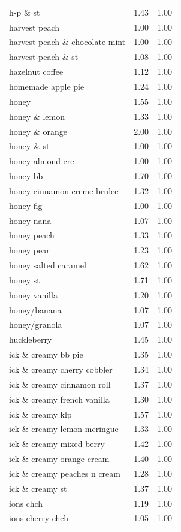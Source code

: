\begin{table}
\begin{tabular}{lrr}
h-p \& st & 1.43 & 1.00 \\
harvest peach & 1.00 & 1.00 \\
harvest peach \& chocolate mint & 1.00 & 1.00 \\
harvest peach \& st & 1.08 & 1.00 \\
hazelnut coffee & 1.12 & 1.00 \\
homemade apple pie & 1.24 & 1.00 \\
honey & 1.55 & 1.00 \\
honey \& lemon & 1.33 & 1.00 \\
honey \& orange & 2.00 & 1.00 \\
honey \& st & 1.00 & 1.00 \\
honey almond cre & 1.00 & 1.00 \\
honey bb & 1.70 & 1.00 \\
honey cinnamon creme brulee & 1.32 & 1.00 \\
honey fig & 1.00 & 1.00 \\
honey nana & 1.07 & 1.00 \\
honey peach & 1.33 & 1.00 \\
honey pear & 1.23 & 1.00 \\
honey salted caramel & 1.62 & 1.00 \\
honey st & 1.71 & 1.00 \\
honey vanilla & 1.20 & 1.00 \\
honey/banana & 1.07 & 1.00 \\
honey/granola & 1.07 & 1.00 \\
huckleberry & 1.45 & 1.00 \\
ick \& creamy bb pie & 1.35 & 1.00 \\
ick \& creamy cherry cobbler & 1.34 & 1.00 \\
ick \& creamy cinnamon roll & 1.37 & 1.00 \\
ick \& creamy french vanilla & 1.30 & 1.00 \\
ick \& creamy klp & 1.57 & 1.00 \\
ick \& creamy lemon meringue & 1.33 & 1.00 \\
ick \& creamy mixed berry & 1.42 & 1.00 \\
ick \& creamy orange cream & 1.40 & 1.00 \\
ick \& creamy peaches n cream & 1.28 & 1.00 \\
ick \& creamy st & 1.37 & 1.00 \\
ions chch & 1.19 & 1.00 \\
ions cherry chch & 1.05 & 1.00 \\

\end{tabular}
\end{table}
